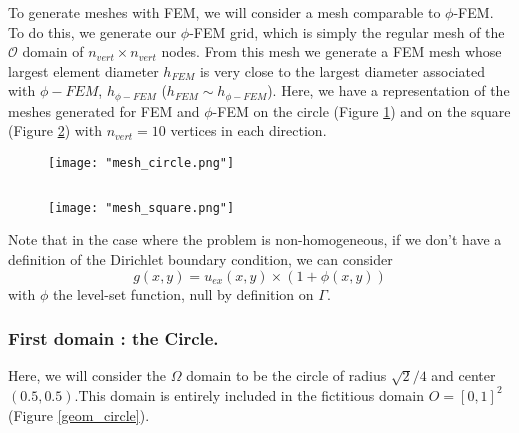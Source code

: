 \begin{Rem}
	To generate meshes with FEM, we will consider a mesh comparable to $\phi$-FEM. To do this, we generate our $\phi$-FEM grid, which is simply the regular mesh of the $\mathcal{O}$ domain of $n_{vert}\times n_{vert}$ nodes. From this mesh we generate a FEM mesh whose largest element diameter $h_{FEM}$ is very close to the largest diameter associated with $\phi-FEM$, $h_{\phi-FEM}$ ($h_{FEM}\sim h_{\phi-FEM}$). Here, we have a representation of the meshes generated for FEM and $\phi$-FEM on the circle (Figure \ref{mesh_circle}) and on the square (Figure \ref{mesh_square}) with $n_{vert}=10$ vertices in each direction.
	
	\begin{minipage}{0.48\linewidth}
		\begin{figure}[H]
			\centering
			\texttt{[image: "mesh\_circle.png"]}
			\label{mesh_circle}
		\end{figure} 
	\end{minipage} $\qquad$
	\begin{minipage}{0.48\linewidth}
		\begin{figure}[H]
			\centering
			\texttt{[image: "mesh\_square.png"]}
			\label{mesh_square}
		\end{figure} 
	\end{minipage}
\end{Rem}

\begin{Rem}
	Note that in the case where the problem is non-homogeneous, if we don't have a definition of the Dirichlet boundary condition, we can consider
	\begin{equation*}
	g(x,y)=u_{ex}(x,y)\times(1+\phi(x,y))
	\end{equation*}
	with $\phi$ the level-set function, null by definition on $\Gamma$.
\end{Rem}

\subsubsection{First domain : the Circle.} \label{Corr.pb.circle}

Here, we will consider the $\Omega$ domain to be the circle of radius $\sqrt{2}/4$ and center $(0.5,0.5)$.This domain is entirely included in the fictitious domain $O=[0,1]^2$ (Figure \ref{geom_circle}).

